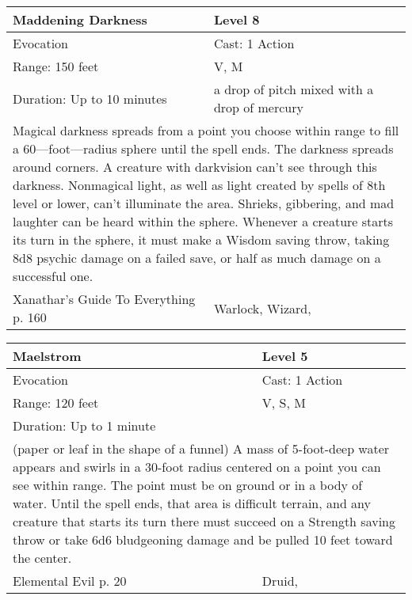 \documentclass[11pt]{report}
\begin{document}
\begin{table}[H]
	\begin{tabular}{||p{6cm}|p{6cm}||}
		\hline\hline
		\bf{Maddening Darkness} & Level 8\\ \hline
		Evocation & Cast: 1 Action\\ \hline
		Range: 150 feet & V, M\\ \hline
		Duration: Up to 10 minutes & a drop of pitch mixed with a drop of mercury\\ \hline
		\multicolumn{2}{||p{12cm}||}{Magical darkness spreads from a point you choose within range to fill a 60—foot—radius sphere until the spell ends. The darkness spreads around corners. A creature with darkvision can’t see through this darkness. Nonmagical light, as well as light created by spells of 8th level or lower, can't illuminate the area. Shrieks, gibbering, and mad laughter can be heard within the sphere. Whenever a creature starts its turn in the sphere, it must make a Wisdom saving throw, taking 8d8 psychic damage on a failed save, or half as much damage on a successful one.}\\ \hline
Xanathar's Guide To Everything p. 160 & Warlock, Wizard, \\ \hline\hline
	\end{tabular}
\end{table}

\begin{table}[H]
	\begin{tabular}{||p{6cm}|p{6cm}||}
		\hline\hline
		\bf{Maelstrom} & Level 5\\ \hline
		Evocation & Cast: 1 Action\\ \hline
		Range: 120 feet & V, S, M\\ \hline
		Duration: Up to 1 minute & \\ \hline
		\multicolumn{2}{||p{12cm}||}{(paper or leaf in the shape of a funnel)
A mass of 5-foot-deep water appears and swirls in a 30-foot radius centered on a point you can see within range. The point must be on ground or in a body of water. Until the spell ends, that area is difficult terrain, and any creature that starts its turn there must succeed on a Strength saving throw or take 6d6 bludgeoning damage and be pulled 10 feet toward the center.}\\ \hline
Elemental Evil p. 20 & Druid, \\ \hline\hline
	\end{tabular}
\end{table}
\end{document}
